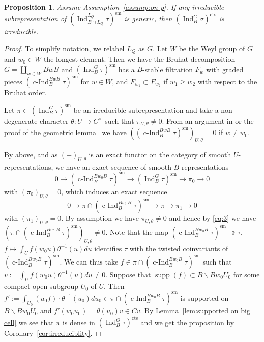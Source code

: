 \documentclass[a4paper]{amsart}
\numberwithin{equation}{section}
\newtheorem{prop}[thm]{Proposition}
\theoremstyle{remark}
\theoremstyle{definition}
\DeclareMathOperator{\Ind}{Ind}
\DeclareMathOperator{\cInd}{c-Ind}
\newcommand{\sm}{\mathrm{sm}}
\DeclareMathOperator{\supp}{supp}
\newcommand{\cts}{\mathrm{cts}}
\newcommand{\onto}{\twoheadrightarrow}
\begin{document}
\begin{prop}\label{prop:whittaker criterion}
Assume Assumption~\ref{assump:on p}.
If any irreducible subrepresentation of $(\Ind_{B\cap L_{Q}}^{L_{Q}}\tau)^{\sm}$ is generic, then $(\Ind_{B}^{G}\sigma)^{\cts}$ is irreducible.
\end{prop}
\begin{proof}
To simplify notation, we relabel $L_Q$ as $G$. Let $W$ be the Weyl group of $G$ and $w_{0}\in W$ the longest element.
Then we have the Bruhat decomposition $G = \coprod_{w\in W}BwB$ and $(\Ind_{B}^{G}\tau)^{\sm}$ has a $B$-stable filtration $F_{w}$ with graded pieces $(\cInd_{B}^{B w B} \tau)^{\sm}$ for $w \in W$, and $F_{w_{1}}\subset F_{w_{2}}$ if $w_{1}\ge w_{2}$ with respect to the Bruhat order.

Let $\pi\subset (\Ind_{B}^{G}\tau)^{\sm}$ be an irreducible subrepresentation and take a non-degenerate character $\theta\colon U\to C^{\times}$ such that $\pi_{U,\theta}\ne 0$.
From an argument in \cite[p.~211]{MR581582} or the proof of the geometric lemma~\cite[5.2 Theorem]{MR0579172} we have $((\cInd_{B}^{BwB} \tau)^{\sm})_{U,\theta} = 0$ if $w \ne w_0$.
  
  By above, and as $(-)_{U,\theta}$ is an exact functor on the category of smooth $U$-representations, we have an exact sequence of smooth $B$-representations
  \[ 0 \to (\cInd_{B}^{B w_0 B} \tau)^{\sm} \to (\Ind_{B}^{G}\tau)^{\sm} \to \pi_{0} \to 0 \]
  with $(\pi_{0})_{U,\theta} = 0$, which induces an exact sequence
  \begin{equation}\label{eq:3}
    0 \to \pi \cap (\cInd_{B}^{Bw_0B} \tau)^{\sm} \to \pi \to \pi_{1} \to 0
  \end{equation}
  with $(\pi_1)_{U,\theta} = 0$.
  By assumption we have $\pi_{U,\theta} \ne 0$ and hence by \eqref{eq:3} we have $(\pi \cap (\cInd_{B}^{Bw_0B} \tau)^{\sm})_{U,\theta} \ne 0$.
  Note that the map $(\cInd_{B}^{Bw_0B} \tau)^{\sm} \onto \tau$, $f \mapsto \int_U f(w_0 u) \theta^{-1}(u) du$ identifies $\tau$ with the twisted coinvariants of $(\cInd_{B}^{Bw_0B} \tau)^{\sm}$.
  We can thus take $f \in \pi \cap (\cInd_{B}^{Bw_0B} \tau)^{\sm}$ such that $v := \int_U f(w_0 u) \theta^{-1}(u) du \ne 0$.
  Suppose that $\supp(f) \subset B\backslash Bw_0 U_0$ for some compact open subgroup $U_0$ of $U$.
  Then $f' := \int_{U_0} (u_0f) \cdot \theta^{-1}(u_0)du_{0} \in \pi \cap (\cInd_{B}^{Bw_0B} \tau)^{\sm}$ is supported on $B\backslash Bw_0 U_0$ and $f'(w_0 u_0) = \theta(u_0)v \in Cv$.
  By Lemma~\ref{lem:supported on big cell} we see that $\pi$ is dense in $(\Ind_{B}^{G}\tau)^{\cts}$ and we get the proposition by Corollary~\ref{cor:irreduciblity}.
\end{proof}
\end{document}
